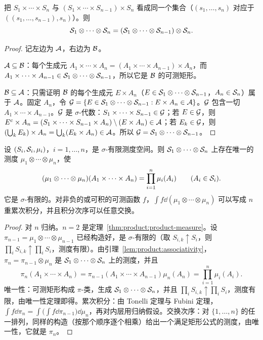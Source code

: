 \begin{lemma}\label{lem:product:associativity}
把 $S_1\times\cdots\times S_n$ 与 $(S_1\times\cdots\times S_{n-1})\times S_n$ 看成同一个集合（$(s_1,\dots,s_n)$ 对应于 $((s_1,\dots,s_{n-1}),s_n)$）。则
\[
\mathcal{S}_1\otimes\cdots\otimes\mathcal{S}_n=(\mathcal{S}_1\otimes\cdots\otimes\mathcal{S}_{n-1})\otimes\mathcal{S}_n .
\]
\end{lemma}
\begin{proof}
记左边为 $\mathcal{A}$，右边为 $\mathcal{B}$。

$\mathcal{A}\subseteq\mathcal{B}$：每个生成元 $A_1\times\cdots\times A_n=(A_1\times\cdots\times A_{n-1})\times A_n$，而 $A_1\times\cdots\times A_{n-1}\in\mathcal{S}_1\otimes\cdots\otimes\mathcal{S}_{n-1}$，所以它是 $\mathcal{B}$ 的可测矩形。

$\mathcal{B}\subseteq\mathcal{A}$：只需证明 $\mathcal{B}$ 的每个生成元 $E\times A_n$（$E\in\mathcal{S}_1\otimes\cdots\otimes\mathcal{S}_{n-1}$，$A_n\in\mathcal{S}_n$）属于 $\mathcal{A}$。固定 $A_n$，令 $\mathcal{G}=\{E\in\mathcal{S}_1\otimes\cdots\otimes\mathcal{S}_{n-1}:E\times A_n\in\mathcal{A}\}$。$\mathcal{G}$ 包含一切 $A_1\times\cdots\times A_{n-1}$。$\mathcal{G}$ 是 $\sigma$-代数：$S_1\times\cdots\times S_{n-1}\in\mathcal{G}$；若 $E\in\mathcal{G}$，则 $E^c\times A_n=(S_1\times\cdots\times S_{n-1}\times A_n)\setminus(E\times A_n)\in\mathcal{A}$；若 $E_k\in\mathcal{G}$，则 $(\bigcup_kE_k)\times A_n=\bigcup_k(E_k\times A_n)\in\mathcal{A}$。所以 $\mathcal{G}=\mathcal{S}_1\otimes\cdots\otimes\mathcal{S}_{n-1}$。
\end{proof}

\begin{theorem}[有限个测度的乘积]\label{thm:product:finite-product}
设 $(S_i,\mathcal{S}_i,\mu_i)$，$i=1,\dots,n$，是 $\sigma$-有限测度空间。则 $\mathcal{S}_1\otimes\cdots\otimes\mathcal{S}_n$ 上存在唯一的测度 $\mu_1\otimes\cdots\otimes\mu_n$，使
\[
(\mu_1\otimes\cdots\otimes\mu_n)(A_1\times\cdots\times A_n)=\prod_{i=1}^n\mu_i(A_i)\qquad(A_i\in\mathcal{S}_i).
\]
它是 $\sigma$-有限的。对非负的或可积的可测函数 $f$，$\int f\dd(\mu_1\otimes\cdots\otimes\mu_n)$ 可以写成 $n$ 重累次积分，并且积分次序可以任意交换。
\end{theorem}
\begin{proof}
对 $n$ 归纳。$n=2$ 是定理~\ref{thm:product:product-measure}。设 $\pi_{n-1}=\mu_1\otimes\cdots\otimes\mu_{n-1}$ 已经构造好，是 $\sigma$-有限的（取 $S_{i,k}\uparrow S_i$，则 $\prod_iS_{i,k}\uparrow\prod_iS_i$，测度有限）。由引理~\ref{lem:product:associativity}，$\pi_n=\pi_{n-1}\otimes\mu_n$ 是 $\mathcal{S}_1\otimes\cdots\otimes\mathcal{S}_n$ 上的测度，并且
\[
\pi_n(A_1\times\cdots\times A_n)=\pi_{n-1}(A_1\times\cdots\times A_{n-1})\mu_n(A_n)=\prod_{i=1}^n\mu_i(A_i).
\]
唯一性：可测矩形构成 $\pi$-类，生成 $\mathcal{S}_1\otimes\cdots\otimes\mathcal{S}_n$，并且 $\prod_iS_{i,k}\uparrow\prod_iS_i$，测度有限，由唯一性定理即得。累次积分：由 Tonelli 定理与 Fubini 定理，$\int f\dd\pi_n=\int\bigl(\int f\dd\pi_{n-1}\bigr)\dd\mu_n$，再对内层用归纳假设。交换次序：对 $\{1,\dots,n\}$ 的任一排列，同样的构造（按那个顺序逐个相乘）给出一个满足矩形公式的测度，由唯一性，它就是 $\pi_n$。
\end{proof}

